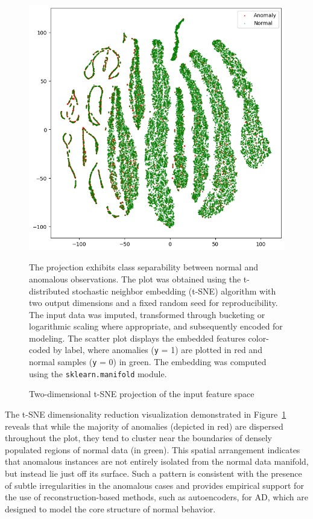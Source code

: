 \begin{figure}[!t]
    \centering
    \footnotesize
    \includegraphics[width=0.75\linewidth]{figures/raw_tsne.png}
    \caption{Two-dimensional t-SNE projection of the input feature space}
    \label{fig:tsne_input}
    \vspace{1mm}
    \begin{minipage}{\columnwidth}
        The projection exhibits class separability between normal and anomalous observations. The plot was obtained using the t-distributed stochastic neighbor embedding (t-SNE) algorithm with two output dimensions and a fixed random seed for reproducibility. The input data was imputed, transformed through bucketing or logarithmic scaling where appropriate, and subsequently encoded for modeling. The scatter plot displays the embedded features color-coded by label, where anomalies (\texttt{y} = 1) are plotted in red and normal samples (\texttt{y} = 0) in green. The embedding was computed using the \texttt{sklearn.manifold} module.
    \end{minipage}
\end{figure}

The t-SNE dimensionality reduction visualization demonstrated in Figure~\ref{fig:tsne_input} reveals that while the majority of anomalies (depicted in red) are dispersed throughout the plot, they tend to cluster near the boundaries of densely populated regions of normal data (in green). This spatial arrangement indicates that anomalous instances are not entirely isolated from the normal data manifold, but instead lie just off its surface. Such a pattern is consistent with the presence of subtle irregularities in the anomalous cases and provides empirical support for the use of reconstruction-based methods, such as autoencoders, for AD, which are designed to model the core structure of normal behavior.


